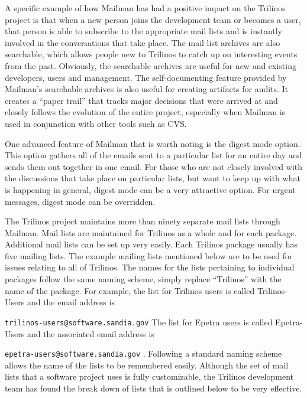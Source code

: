\documentclass[12pt,relax]{article}
\newcommand{\InlineCommand}[1]{
  {\hspace{0.01 in}} {\tt #1} {\hspace{0.01 in}}}
\begin{document}
A specific example of how Mailman 
has had a positive impact on the Trilinos project is that when a new person
joins the development team or becomes a user, that person is able to 
subscribe to the appropriate mail lists and is instantly involved in the 
conversations that take place.  The mail list archives are also searchable, 
which allows people new to Trilinos to catch up on interesting events from the 
past.  Obviously, the searchable archives are useful for new and existing 
developers, users and management.  The self-documenting feature provided 
by Mailman's searchable archives is also useful for creating artifacts for 
audits.  It creates a ``paper trail'' that tracks major decisions that were 
arrived at and closely follows 
the evolution of the entire project, especially when Mailman is used in 
conjunction with other tools such as CVS.

One advanced feature of Mailman that is worth noting is the digest mode option.
This option gathers all of the emails sent to a particular list for an entire 
day and sends them out together in one email.  For those who are not closely 
involved with the discussions that take place on particular lists, but want to 
keep up with what is happening in general, digest mode can be a very 
attractive option.  For urgent messages, digest mode can 
be overridden.

The Trilinos project maintains more than ninety separate mail lists through 
Mailman.  Mail lists are maintained for Trilinos as a whole and for each 
package.  Additional mail lists can be set up very easily.  Each Trilinos 
package usually has five mailing lists.  The example mailing lists mentioned 
below are to be used for issues relating to all of Trilinos.  
The names for the lists pertaining to individual packages follow the same 
naming scheme, simply replace ``Trilinos'' with the name of the package.  For example, the list for Trilinos users is 
called Trilinos-Users and the email address is 
\InlineCommand{trilinos-users@software.sandia.gov}  The list 
for Epetra users is called Epetra-Users and the associated email address is 
\InlineCommand{epetra-users@software.sandia.gov}.  Following a standard naming
scheme allows the name of the lists to be remembered easily.  Although the 
set of mail lists that a software project uses is fully customizable, the 
Trilinos development team has found the break down of lists that is outlined 
below to be very effective.
\end{document}
